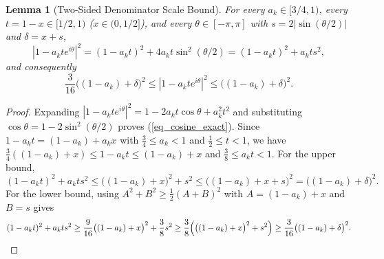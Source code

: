 \documentclass[11pt,reqno]{amsart}
\newtheorem{lem}[thm]{Lemma}
\numberwithin{equation}{section}
\begin{document}
\begin{lem}[Two-Sided Denominator Scale Bound] \label{lem_denom_scale}
For every $a_k \in [3/4, 1)$, every $t = 1 - x \in [1/2, 1)$ ($x \in (0, 1/2]$), and every $\theta \in [-\pi, \pi]$ with $s = 2|\sin(\theta/2)|$ and $\delta = x + s$,
\begin{equation} \label{eq_cosine_exact}
  |1 - a_k t e^{i\theta}|^2 = (1 - a_k t)^2 + 4 a_k t \sin^2(\theta/2) = (1 - a_k t)^2 + a_k t s^2,
\end{equation}
and consequently
\begin{equation} \label{eq_denom_sandwich}
  \frac{3}{16}\bigl((1 - a_k) + \delta\bigr)^2 \le |1 - a_k t e^{i\theta}|^2 \le \bigl((1 - a_k) + \delta\bigr)^2.
\end{equation}
\end{lem}
\begin{proof}
Expanding $|1 - a_k t e^{i\theta}|^2 = 1 - 2 a_k t \cos\theta + a_k^2 t^2$ and substituting $\cos\theta = 1 - 2\sin^2(\theta/2)$ proves (\ref{eq_cosine_exact}). Since $1 - a_k t = (1 - a_k) + a_k x$ with $\frac{3}{4} \le a_k < 1$ and $\frac{1}{2} \le t < 1$, we have $\frac{3}{4}((1 - a_k) + x) \le 1 - a_k t \le (1 - a_k) + x$ and $\frac{3}{8} \le a_k t < 1$. For the upper bound,
\[
  (1 - a_k t)^2 + a_k t s^2 \le \bigl((1 - a_k) + x\bigr)^2 + s^2 \le \bigl((1 - a_k) + x + s\bigr)^2 = \bigl((1 - a_k) + \delta\bigr)^2.
\]
For the lower bound, using $A^2 + B^2 \ge \frac{1}{2}(A + B)^2$ with $A = (1 - a_k) + x$ and $B = s$ gives
\[
  (1 - a_k t)^2 + a_k t s^2 \ge \frac{9}{16}\bigl((1-a_k)+x\bigr)^2 + \frac{3}{8} s^2 \ge \frac{3}{8}\Bigl(\bigl((1-a_k)+x\bigr)^2 + s^2\Bigr) \ge \frac{3}{16}\bigl((1-a_k) + \delta\bigr)^2. \qedhere
\]
\end{proof}
\end{document}
